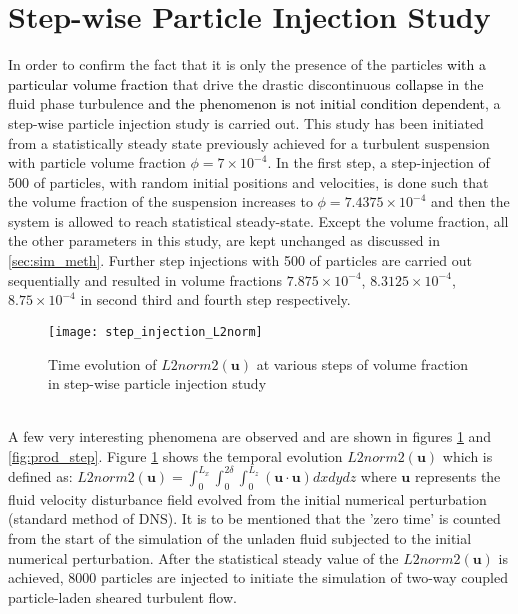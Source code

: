 \documentclass[aip,graphicx]{revtex4-1}
\begin{document}
\section{Step-wise Particle Injection Study}
In order to confirm the fact that it is only the presence of the particles \textcolor{black}{with a particular volume fraction} that drive the drastic discontinuous \textcolor{black}{collapse} in the fluid phase turbulence \textcolor{black}{and the phenomenon is not initial condition dependent}, a step-wise particle injection study is carried out. This study has been initiated from a statistically steady state previously achieved for a turbulent suspension with particle volume fraction $\phi=7\times10^{-4}$. In the first step, a step-injection of 500 of particles, with random initial positions and velocities, is done such that the volume fraction of the suspension increases to $\phi=7.4375\times10^{-4}$  and then the system is allowed to reach statistical steady-state. Except the volume fraction, all the other parameters in this study, are kept unchanged as discussed in \ref{sec:sim_meth}. Further step injections with 500 of particles are carried out sequentially and resulted in volume fractions $7.875\times10^{-4}$, $8.3125\times10^{-4}$, $8.75\times10^{-4}$ in second third and fourth step respectively. 
\begin{figure}[!]
	\texttt{[image: step\_injection\_L2norm]}
	\caption{Time evolution of $L2norm2(\mathbf u)$ at various steps of volume fraction in step-wise particle injection study} 
	\label{fig:L2norm_step}
\end{figure}
\\ A few very interesting phenomena are observed and are shown in figures \ref{fig:L2norm_step} and \ref{fig:prod_step}. Figure \ref{fig:L2norm_step} shows the temporal evolution $L2norm2(\mathbf{u})$ which is defined as:
\begin{math}
L2norm2(\mathbf{u})=\int_{0}^{L_x}\int_{0}^{2\delta}\int_{0}^{L_z} (\textbf{u}\cdot\textbf{u}) dxdydz
\end{math}
where $\mathbf{u}$ represents the fluid velocity disturbance field evolved from the initial numerical perturbation (standard method of DNS). It is to be mentioned that the 'zero time' is counted from the start of the simulation of the unladen fluid subjected to the initial numerical perturbation. After the statistical steady value of the $L2norm2(\mathbf u)$ is achieved, 8000 particles are injected to initiate the simulation of two-way coupled particle-laden sheared turbulent flow.
\end{document}

